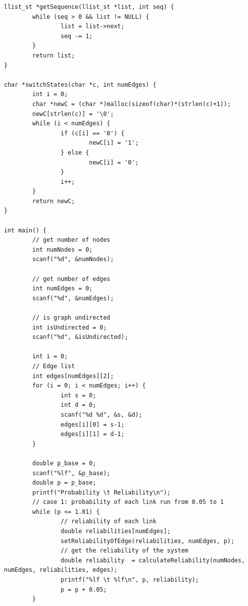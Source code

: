 \documentclass[11pt]{article}
\begin{document}
\begin{lstlisting}
llist_st *getSequence(llist_st *list, int seq) {
        while (seq > 0 && list != NULL) {
                list = list->next;
                seq -= 1;
        }
        return list;
}

char *switchStates(char *c, int numEdges) {
        int i = 0;
        char *newC = (char *)malloc(sizeof(char)*(strlen(c)+1));
        newC[strlen(c)] = '\0';
        while (i < numEdges) {
                if (c[i] == '0') {
                        newC[i] = '1';
                } else {
                        newC[i] = '0';
                }
                i++;
        }
        return newC;
}

int main() {
        // get number of nodes
        int numNodes = 0;
        scanf("%d", &numNodes);

        // get number of edges
        int numEdges = 0;
        scanf("%d", &numEdges);

        // is graph undirected
        int isUndirected = 0;
        scanf("%d", &isUndirected);

        int i = 0;
        // Edge list
        int edges[numEdges][2];
        for (i = 0; i < numEdges; i++) {
                int s = 0;
                int d = 0;
                scanf("%d %d", &s, &d);
                edges[i][0] = s-1;
                edges[i][1] = d-1;
        }

        double p_base = 0;
        scanf("%lf", &p_base);
        double p = p_base;
        printf("Probability \t Reliability\n");
        // case 1: probability of each link run from 0.05 to 1
        while (p <= 1.01) {
                // reliability of each link
                double reliabilities[numEdges];
                setReliabilityOfEdge(reliabilities, numEdges, p);
                // get the reliability of the system
                double reliability  = calculateReliability(numNodes, numEdges, reliabilities, edges);
                printf("%lf \t %lf\n", p, reliability);
                p = p + 0.05;
        }


\end{lstlisting}
\end{document}
